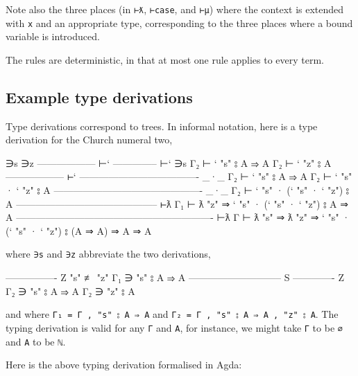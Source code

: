Note also the three places (in \texttt{⊢ƛ}, \texttt{⊢case}, and
\texttt{⊢μ}) where the context is extended with \texttt{x} and an
appropriate type, corresponding to the three places where a bound
variable is introduced.

The rules are deterministic, in that at most one rule applies to every
term.

\hypertarget{Lambda-derivation}{%
\subsection{Example type derivations}\label{Lambda-derivation}}

Type derivations correspond to trees. In informal notation, here is a
type derivation for the Church numeral two,

\begin{myDisplay}
                        ∋s                     ∋z
                        ------------------ ⊢`  -------------- ⊢`
∋s                      Γ₂ ⊢ ` "s" ⦂ A ⇒ A     Γ₂ ⊢ ` "z" ⦂ A
------------------ ⊢`   ------------------------------------- _·_
Γ₂ ⊢ ` "s" ⦂ A ⇒ A      Γ₂ ⊢ ` "s" · ` "z" ⦂ A
---------------------------------------------- _·_
Γ₂ ⊢ ` "s" · (` "s" · ` "z") ⦂ A
-------------------------------------------- ⊢ƛ
Γ₁ ⊢ ƛ "z" ⇒ ` "s" · (` "s" · ` "z") ⦂ A ⇒ A
------------------------------------------------------------- ⊢ƛ
Γ ⊢ ƛ "s" ⇒ ƛ "z" ⇒ ` "s" · (` "s" · ` "z") ⦂ (A ⇒ A) ⇒ A ⇒ A
\end{myDisplay}

where \texttt{∋s} and \texttt{∋z} abbreviate the two derivations,

\begin{myDisplay}
             ---------------- Z
"s" ≢ "z"    Γ₁ ∋ "s" ⦂ A ⇒ A
----------------------------- S       ------------- Z
Γ₂ ∋ "s" ⦂ A ⇒ A                       Γ₂ ∋ "z" ⦂ A
\end{myDisplay}

and where \texttt{Γ₁\ =\ Γ\ ,\ "s"\ ⦂\ A\ ⇒\ A} and
\texttt{Γ₂\ =\ Γ\ ,\ "s"\ ⦂\ A\ ⇒\ A\ ,\ "z"\ ⦂\ A}. The typing
derivation is valid for any \texttt{Γ} and \texttt{A}, for instance, we
might take \texttt{Γ} to be \texttt{∅} and \texttt{A} to be
\texttt{\textasciigrave{}ℕ}.

Here is the above typing derivation formalised in Agda:

